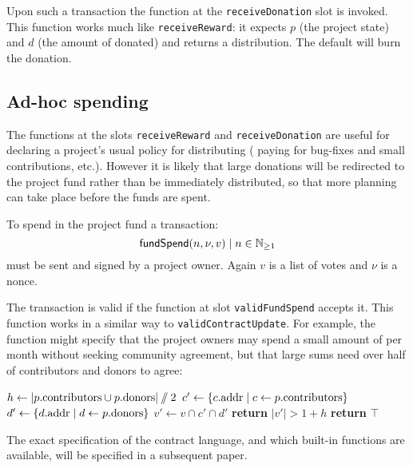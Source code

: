 Upon such a transaction the function at the \texttt{receiveDonation} slot is
invoked. This function works much like \texttt{receiveReward}: it expects $p$
(the project state) and $d$ (the amount of \oscoin{} donated) and returns a
distribution. The default will burn the donation.

\subsection{Ad-hoc spending}

The functions at the slots \texttt{receiveReward} and \texttt{receiveDonation}
are useful for declaring a project's usual policy for distributing \oscoin{}
(\eg{} paying for bug-fixes and small contributions, etc.). However it is likely
that large donations will be redirected to the project fund rather than be
immediately distributed, so that more planning can take place before the funds
are spent.

To spend \oscoin{} in the project fund a transaction:
\[
\mathsf{fundSpend}\small{\lparen n, \nu, v\rparen} \mid n \in \mathbb{N}_{\geq 1}
\]
must be sent and signed by a project owner. Again $v$ is a list of votes and
$\nu$ is a nonce.

The transaction is valid if the function at slot \texttt{validFundSpend} accepts
it. This function works in a similar way to \texttt{validContractUpdate}. For
example, the function might specify that the project owners may spend a small
amount of \oscoin{} per month without seeking community agreement, but that
large sums need over half of contributors and donors to agree:
\begin{algorithmic}[0]
            \State $h \gets |p.{\mathrm{contributors}} \cup p.{\mathrm{donors}}| \sslash 2$
            \State $c' \gets \{ c.{\mathrm{addr}} \mid c \gets p.{\mathrm{contributors}} \}$
            \State $d' \gets \{ d.{\mathrm{addr}} \mid d \gets p.{\mathrm{donors}} \}$
            \State $v' \gets v \cap c' \cap d'$
            \State \textbf{return} $|v'| > 1 + h$
            \Else
            \State \textbf{return} $\top$
        \EndIf
    \EndProcedure
\end{algorithmic}

The exact specification of the contract language, and which built-in functions
are available, will be specified in a subsequent paper.

